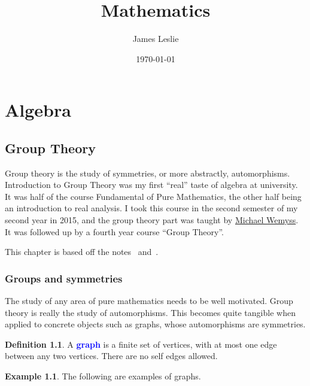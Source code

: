 \documentclass[12pt]{report}
\title{Mathematics}
\author{James Leslie}
\date{\today}
\newcommand{\indx}[1]{\index{#1}\textbf{\textcolor{blue}{#1}}}
\theoremstyle{definition}
\newtheorem{definition}[theorem]{Definition}
\newtheorem{example}[theorem]{Example}
\begin{document}
\maketitle
\tableofcontents

\part{Algebra}

\chapter{Group Theory}\label{cha:intr-group-theory}
Group theory is the study of symmetries, or more abstractly, automorphisms.
%
Introduction to Group Theory was my first ``real'' taste of algebra at university.
%
It was half of the course Fundamental of Pure Mathematics, the other half being an introduction to real analysis.
%
I took this course in the second semester of my second year in 2015, and the group theory part was taught by \href{https://www.maths.gla.ac.uk/~mwemyss/}{Michael Wemyss}.
%
It was followed up by a fourth year course ``Group Theory''.


This chapter is based off the notes~\cite{wemyss2015grouptheory} and~\cite{lanini2017grouptheory}.



\section{Groups and symmetries}
The study of any area of pure mathematics needs to be well motivated.
%
Group theory is really the study of automorphisms.
%
This becomes quite tangible when applied to concrete objects such as graphs, whose automorphisms are symmetries.


\begin{definition}\cite[Definition 1.1.1]{wemyss2015grouptheory}\label{def:intr-group-theory:graph}
  A \indx{graph} is a finite set of vertices, with at most one edge between any two vertices.
  There are no self edges allowed.
\end{definition}

\begin{example}
  The following are examples of graphs.

\end{example}
\end{document}
